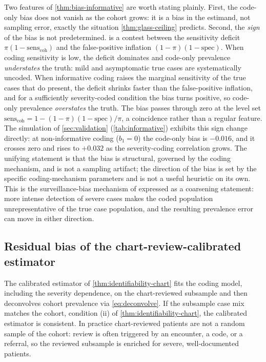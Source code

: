 Two features of \cref{thm:bias-informative} are worth stating
plainly. First, the code-only bias does not vanish as the cohort grows:
it is a bias in the estimand, not sampling error, exactly the situation
\cref{thm:glass-ceiling} predicts. Second, the \emph{sign} of the bias
is not predetermined.  is a contest between
the sensitivity deficit $\pi(1 - \mathrm{sens}_{\text{coh}})$ and the
false-positive inflation $(1-\pi)(1-\mathrm{spec})$. When coding
sensitivity is low, the deficit dominates and code-only prevalence
\emph{understates} the truth: mild and asymptomatic true cases are
systematically uncoded. When informative coding raises the marginal
sensitivity of the true cases that do present, the deficit shrinks
faster than the false-positive inflation, and for a sufficiently
severity-coded condition the bias turns positive, so code-only
prevalence \emph{overstates} the truth. The bias passes through zero
at the level set $\mathrm{sens}_{\text{coh}} = 1 -
(1-\pi)(1-\mathrm{spec})/\pi$, a coincidence rather than a regular
feature. The simulation of \cref{sec:validation} (\cref{tab:informative})
exhibits this sign change directly: at non-informative coding ($b_1 =
0$) the code-only bias is $-0.016$, and it crosses zero and rises to
$+0.032$ as the severity-coding correlation grows. The unifying
statement is that the bias is structural, governed by the coding
mechanism, and is not a sampling artifact; the direction of the bias
is set by the specific coding-mechanism parameters and is not a useful
heuristic on its own. This is the surveillance-bias mechanism of
\citet{haut2011surveillance,carrell2014surveillance} expressed as a
coarsening statement: more intense detection of severe cases makes the
coded population unrepresentative of the true case population, and
the resulting prevalence error can move in either direction.

\subsection{Residual bias of the chart-review-calibrated estimator}

The calibrated estimator of \cref{thm:identifiability-chart} fits the
coding model, including the severity dependence, on the chart-reviewed
subsample and then deconvolves cohort prevalence via
\eqref{eq:deconvolve}. If the subsample case mix matches the cohort,
condition (ii) of \cref{thm:identifiability-chart}, the calibrated
estimator is consistent. In practice chart-reviewed patients are not a
random sample of the cohort: review is often triggered by an encounter,
a code, or a referral, so the reviewed subsample is enriched for
severe, well-documented patients.

